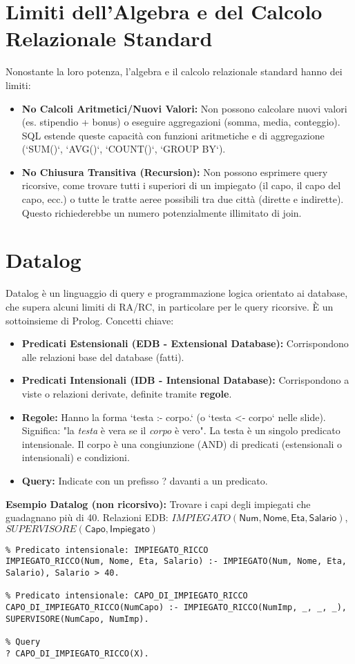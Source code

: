 \documentclass{article}
\newcommand{\Rel}[1]{\textit{#1}} %
\newcommand{\Attr}[1]{\textsf{#1}} %
\begin{document}
	\section{Limiti dell'Algebra e del Calcolo Relazionale Standard}
	Nonostante la loro potenza, l'algebra e il calcolo relazionale standard hanno dei limiti:
	\begin{itemize}
		\item \textbf{No Calcoli Aritmetici/Nuovi Valori:} Non possono calcolare nuovi valori (es. stipendio + bonus) o eseguire aggregazioni (somma, media, conteggio). SQL estende queste capacità con funzioni aritmetiche e di aggregazione (`SUM()`, `AVG()`, `COUNT()`, `GROUP BY`).
		\item \textbf{No Chiusura Transitiva (Recursion):} Non possono esprimere query ricorsive, come trovare tutti i superiori di un impiegato (il capo, il capo del capo, ecc.) o tutte le tratte aeree possibili tra due città (dirette e indirette). Questo richiederebbe un numero potenzialmente illimitato di join.
	\end{itemize}
	
	\section{Datalog}
	Datalog è un linguaggio di query e programmazione logica orientato ai database, che supera alcuni limiti di RA/RC, in particolare per le query ricorsive. È un sottoinsieme di Prolog.
	Concetti chiave:
	\begin{itemize}
		\item \textbf{Predicati Estensionali (EDB - Extensional Database):} Corrispondono alle relazioni base del database (fatti).
		\item \textbf{Predicati Intensionali (IDB - Intensional Database):} Corrispondono a viste o relazioni derivate, definite tramite \textbf{regole}.
		\item \textbf{Regole:} Hanno la forma `testa :- corpo.` (o `testa <- corpo` nelle slide).
		Significa: "la \textit{testa} è vera se il \textit{corpo} è vero".
		La testa è un singolo predicato intensionale. Il corpo è una congiunzione (AND) di predicati (estensionali o intensionali) e condizioni.
		\item \textbf{Query:} Indicate con un prefisso ? davanti a un predicato.
	\end{itemize}
	
	\textbf{Esempio Datalog (non ricorsivo):} Trovare i capi degli impiegati che guadagnano più di 40.
	Relazioni EDB: $\Rel{IMPIEGATO}(\Attr{Num}, \Attr{Nome}, \Attr{Eta}, \Attr{Salario})$, $\Rel{SUPERVISORE}(\Attr{Capo}, \Attr{Impiegato})$
	\begin{verbatim}
% Predicato intensionale: IMPIEGATO_RICCO
IMPIEGATO_RICCO(Num, Nome, Eta, Salario) :- IMPIEGATO(Num, Nome, Eta, Salario), Salario > 40.

% Predicato intensionale: CAPO_DI_IMPIEGATO_RICCO
CAPO_DI_IMPIEGATO_RICCO(NumCapo) :- IMPIEGATO_RICCO(NumImp, _, _, _),
SUPERVISORE(NumCapo, NumImp).

% Query
? CAPO_DI_IMPIEGATO_RICCO(X).
	\end{verbatim}
	
\end{document}
